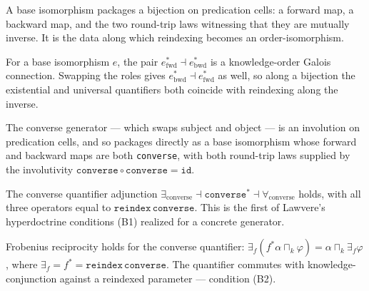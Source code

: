 \begin{definition}\label{def:baseIso}\leanok{}
A base isomorphism packages a bijection on predication cells: a forward map, a
backward map, and the two round-trip laws witnessing that they are mutually
inverse. It is the data along which reindexing becomes an order-isomorphism.
\end{definition}

\begin{theorem}\label{thm:galois-reindex}\leanok{}
For a base isomorphism $e$, the pair $e_{\mathrm{fwd}}^{*} \dashv
e_{\mathrm{bwd}}^{*}$ is a knowledge-order Galois connection. Swapping the roles
gives $e_{\mathrm{bwd}}^{*} \dashv e_{\mathrm{fwd}}^{*}$ as well, so along a
bijection the existential and universal quantifiers both coincide with reindexing
along the inverse.
\end{theorem}

\begin{definition}\label{def:converseIso}\leanok{}
The converse generator --- which swaps subject and object --- is an involution on
predication cells, and so packages directly as a base isomorphism whose forward
and backward maps are both \texttt{converse}, with both round-trip laws supplied
by the involutivity $\texttt{converse}\circ\texttt{converse} = \texttt{id}$.
\end{definition}

\begin{theorem}\label{thm:converse-adjunction}\leanok{}
The converse quantifier adjunction $\exists_{\mathrm{converse}} \dashv
\texttt{converse}^{*} \dashv \forall_{\mathrm{converse}}$ holds, with all three
operators equal to $\texttt{reindex}\,\texttt{converse}$. This is the first of
Lawvere's hyperdoctrine conditions (B1) realized for a concrete generator.
\end{theorem}

\begin{theorem}\label{thm:converse-frobenius}\leanok{}
Frobenius reciprocity holds for the converse quantifier:
$\exists_{f}(f^{*}\alpha \sqcap_k \varphi) = \alpha \sqcap_k \exists_{f}\varphi$,
where $\exists_{f} = f^{*} = \texttt{reindex}\,\texttt{converse}$. The quantifier
commutes with knowledge-conjunction against a reindexed parameter --- condition
(B2).
\end{theorem}

